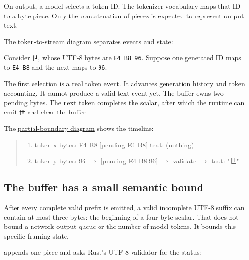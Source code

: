 On output, a model selects a token ID. The tokenizer vocabulary maps
that ID to a byte piece. Only the concatenation of pieces is expected to
represent output text.

The
\href{https://github.com/hermonai/inside-the-llm-engine/blob/astra-visual-rewrite/diagrams/tokenizer/token-to-byte-stream.txt}{token-to-stream
diagram} separates events and state:


Consider \texttt{世}, whose UTF-8 bytes are \texttt{E4\ B8\ 96}. Suppose
one generated ID maps to \texttt{E4\ B8} and the next maps to
\texttt{96}.

The first selection is a real token event. It advances generation
history and token accounting. It cannot produce a valid text event yet.
The buffer owns two pending bytes. The next token completes the scalar,
after which the runtime can emit \texttt{世} and clear the buffer.

The
\href{https://github.com/hermonai/inside-the-llm-engine/blob/astra-visual-rewrite/diagrams/tokenizer/utf8-partial-token-boundary.txt}{partial-boundary
diagram} shows the timeline:

\begin{quote}
\begin{enumerate}
\item token x bytes: E4 B8        [pending E4 B8]        text: (nothing)
\item token y bytes:       96   \(\longrightarrow\)  [pending E4 B8 96]  \(\longrightarrow\)  validate  \(\longrightarrow\)  text: "世"
\end{enumerate}
\end{quote}

\subsection{The buffer has a small semantic
bound}\label{the-buffer-has-a-small-semantic-bound}

After every complete valid prefix is emitted, a valid incomplete UTF-8
suffix can contain at most three bytes: the beginning of a four-byte
scalar. That does not bound a network output queue or the number of
model tokens. It bounds this specific framing state.

\texttt{} appends one piece and asks
Rust's UTF-8 validator for the status:

